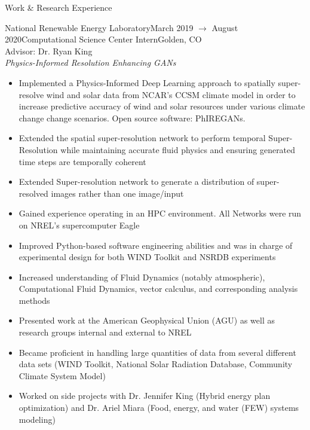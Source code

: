 \documentclass{resume} %
\begin{document}
\begin{rSection}{Work \& Research Experience}
\begin{rSubsection}{National Renewable Energy Laboratory}{March 2019 $\to$ August 2020}{Computational Science Center Intern}{Golden, CO}\\
Advisor: Dr. Ryan King \\
\textit{Physics-Informed Resolution Enhancing GANs}
\begin{itemize}
    \renewcommand\labelitemi{\textbullet}
    \setlength \itemsep{-0.4em}
    \item Implemented a Physics-Informed Deep Learning approach to spatially super-resolve wind and solar data from NCAR's CCSM climate model in order to increase predictive accuracy of wind and solar resources under various climate change change scenarios. Open source software: PhIREGANs.
    \item Extended the spatial super-resolution network to perform temporal Super-Resolution while maintaining accurate fluid physics and ensuring generated time steps are temporally coherent
    \item Extended Super-resolution network to generate a distribution of super-resolved images rather than one image/input
    \item Gained experience operating in an HPC environment. All Networks were run on NREL's supercomputer Eagle
    \item Improved Python-based software engineering abilities and was in charge of experimental design for both WIND Toolkit and NSRDB experiments
    \item Increased understanding of Fluid Dynamics (notably atmospheric), Computational Fluid Dynamics, vector calculus, and corresponding analysis methods
    \item Presented work at the American Geophysical Union (AGU) as well as research groups internal and external to NREL
    \item Became proficient in handling large quantities of data from several different data sets (WIND Toolkit, National Solar Radiation Database, Community Climate System Model)
    \item Worked on side projects with Dr. Jennifer King (Hybrid energy plan optimization) and Dr. Ariel Miara (Food, energy, and water (FEW) systems modeling)
\end{itemize}

\end{rSubsection}


\end{rSection}
\end{document}

